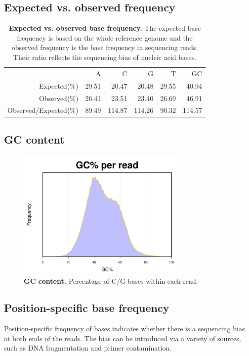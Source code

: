 \documentclass{article}
\begin{document}
\subsection{Expected vs. observed frequency}
\begin{table}
\begin{tabular}{|r|r|r|r|r|r|}
  \hline
 & A & C & G & T & GC \\ 
  \rowcolor[gray]{0.9} \hline
Expected(\%) & 29.51 &  20.47 &  20.48 & 29.55 &  40.94 \\ 
  Observed(\%) & 26.41 &  23.51 &  23.40 & 26.69 &  46.91 \\ 
   \rowcolor[gray]{0.9}Observed/Expected(\%) & 89.49 & 114.87 & 114.26 & 90.32 & 114.57 \\ 
   \hline
\end{tabular}\caption{\textbf{Expected vs. observed base frequency.} The expected base frequency is based on the whole reference genome and the observed frequency is the base frequency in sequencing reads. Their ratio reflects the sequencing bias of nucleic acid bases.}
\end{table}

\subsection{GC content}
\begin{center}
\begin{figure}
\includegraphics[width=3.2in, height=2.5in]{bamchop-base-gc}
\caption{\textbf{GC content.} Percentage of C/G bases within each read.}
\end{figure}
\end{center}

\subsection{Position-specific base frequency}
Position-specific frequency of bases indicates whether there is a sequencing bias at both ends of the reads. The bias can be introduced via a variety of sources, such as DNA fragmentation and primer contamination. 
\end{document}
